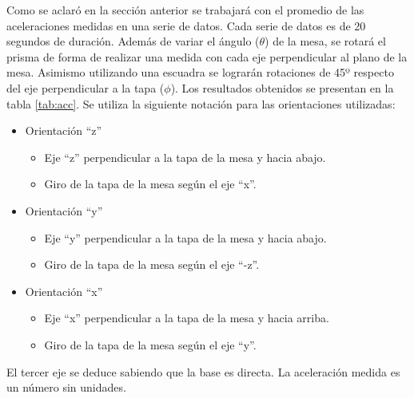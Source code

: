 \documentclass[main]{subfiles}
\begin{document}
Como se aclaró en la sección anterior se trabajará con el promedio de las aceleraciones medidas en una serie de datos. Cada serie de datos es de 20 segundos de duración. Además de variar el ángulo ($\theta$) de la mesa, se rotará el prisma de forma de realizar una medida con cada eje perpendicular al plano de la mesa. Asimismo utilizando una escuadra se lograrán rotaciones de 45º respecto del eje perpendicular a la tapa ($\phi$). Los resultados obtenidos se presentan en la tabla \ref{tab:acc}. Se utiliza la siguiente notación para las orientaciones utilizadas:
\begin{itemize}
	\item Orientación ``z''
	\begin{itemize}
		\item Eje ``z'' perpendicular a la tapa de la mesa y hacia abajo.
		\item Giro de la tapa de la mesa según el eje ``x''.
	\end{itemize}
	\item Orientación ``y''
	\begin{itemize}
		\item Eje ``y'' perpendicular a la tapa de la mesa y hacia abajo.
		\item Giro de la tapa de la mesa según el eje ``-z''.
	\end{itemize}
	\item Orientación ``x''
	\begin{itemize}
		\item Eje ``x'' perpendicular a la tapa de la mesa y hacia arriba.
		\item Giro de la tapa de la mesa según el eje ``y''.
	\end{itemize}
\end{itemize}
El tercer eje se deduce sabiendo que la base es directa. La aceleración medida es un número sin unidades.
\end{document}
